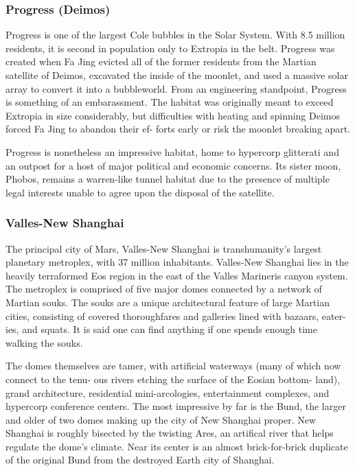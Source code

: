 \subsubsection{Progress (Deimos)}

Progress is one of the largest Cole bubbles in the Solar 
System. With 8.5 million residents, it is second in 
population only to Extropia in the belt. Progress was 
created when Fa Jing evicted all of the former residents 
from the Martian satellite of Deimos, excavated the 
inside of the moonlet, and used a massive solar array 
to convert it into a bubbleworld. From an engineering 
standpoint, Progress is something of an embarassment. 
The habitat was originally meant to exceed Extropia 
in size considerably, but difficulties with heating and 
spinning Deimos forced Fa Jing to abandon their ef-
forts early or risk the moonlet breaking apart.

Progress is nonetheless an impressive habitat, home 
to hypercorp glitterati and an outpost for a host of 
major political and economic concerns. Its sister 
moon, Phobos, remains a warren-like tunnel habitat 
due to the presence of multiple legal interests unable 
to agree upon the disposal of the satellite.

\subsubsection{Valles-New Shanghai}

The principal city of Mars, Valles-New Shanghai is 
transhumanity's largest planetary metroplex, with 37 
million inhabitants. Valles-New Shanghai lies in the 
heavily terraformed Eos region in the east of the Valles 
Marineris canyon system. The metroplex is comprised 
of five major domes connected by a network of 
Martian souks. The souks are a unique architectural 
feature of large Martian cities, consisting of covered 
thoroughfares and galleries lined with bazaars, eater-
ies, and squats. It is said one can find anything if one 
spends enough time walking the souks.

The domes themselves are tamer, with artificial 
waterways (many of which now connect to the tenu-
ous rivers etching the surface of the Eosian bottom-
land), grand architecture, residential mini-arcologies, 
entertainment complexes, and hypercorp conference 
centers. The most impressive by far is the Bund, the 
larger and older of two domes making up the city 
of New Shanghai proper. New Shanghai is roughly 
bisected by the twisting Ares, an artifical river that 
helps regulate the dome's climate. Near its center is an 
almost brick-for-brick duplicate of the original Bund 
from the destroyed Earth city of Shanghai.

